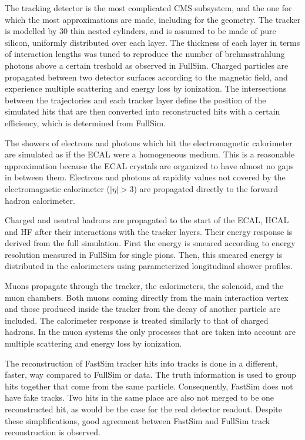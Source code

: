 The tracking detector is the most complicated CMS subsystem, and the one for which the most
approximations are made, including for the geometry.
The tracker is modelled by 30 thin nested cylinders, and is assumed to be made of pure silicon,
uniformly distributed over each layer. The thickness of each layer in terms of interaction lengths
was tuned to reproduce the number of brehmsstrahlung photons above a certain treshold as observed in
FullSim.
Charged particles are propagated between two detector surfaces according to the magnetic field, and
experience multiple scattering and energy loss by ionization. The intersections between the
trajectories and each tracker layer define the position of the simulated hits that are then
converted into reconstructed hits with a certain efficiency, which is determined from FullSim. 

The showers of electrons and photons which hit the electromagnetic calorimeter are simulated as if
the ECAL were a homogeneous medium. This is a reasonable approximation because the ECAL crystals
are organized to have almost no gaps in between them. 
Electrons and photons at rapidity values not covered by the electromagnetic calorimeter ($|\eta| >
3$) are propagated directly to the forward hadron calorimeter.

Charged and neutral hadrons are propagated to the start of the ECAL, HCAL and HF after their
interactions with the tracker layers. Their energy response is derived from the full
simulation. First the energy is smeared according to energy resolution measured in FullSim for
single pions. Then, this smeared energy is distributed in the calorimeters using parameterized
longitudinal shower profiles. 

Muons propagate through the tracker, the calorimeters, the solenoid, and the muon chambers. 
Both muons coming directly from the main interaction vertex and those produced inside the
tracker from the decay of another particle are included. 
The calorimeter response is treated similarly to that of charged hadrons. In the muon systems the
only processes that are taken into account are multiple scattering and energy loss by ionization.

The reconstruction of FastSim tracker hits into tracks is done in a different, faster, way compared
to FullSim or data. The truth information is used to group hits together that come from the same
particle. Consequently, FastSim does not have fake tracks. Two hits in the same place are also not
merged to be one reconstructed hit, as would be the case for the real detector readout. 
Despite these simplifications, good agreement between FastSim and FullSim track reconstruction is
observed. 


